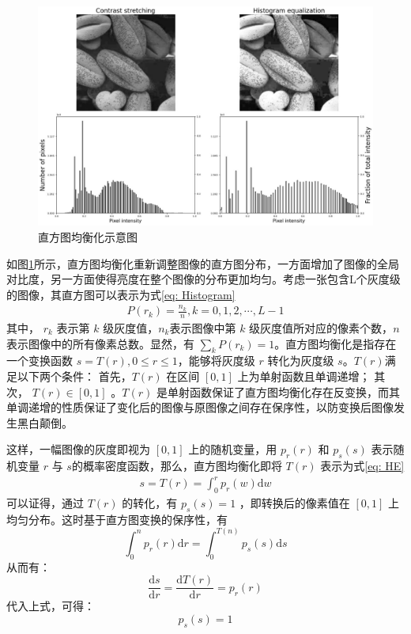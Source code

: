 \documentclass[a4paper, 10pt]{article}
\begin{document}
	\begin{figure}[htb]
		\centering 
		\includegraphics[width=\columnwidth]{picture/LLIE/HE/Histogram equalization}
		\caption{
			\label{fig: Histogram equalization} 
			直方图均衡化示意图
		}
	\end{figure}
	
	如图\ref{fig: Histogram equalization}所示，直方图均衡化重新调整图像的直方图分布，一方面增加了图像的全局对比度，另一方面使得亮度在整个图像的分布更加均匀。考虑一张包含L个灰度级的图像，其直方图可以表示为式\ref{eq: Histogram}
	\begin{equation}
		\begin{aligned}
			P(r_k) = \frac{n_k}{n}, k=0, 1, 2, \cdots, L-1
		\end{aligned}
		\label{eq: Histogram}
	\end{equation}
	其中， $r_k$ 表示第 $k$ 级灰度值，$n_k$表示图像中第 $k$ 级灰度值所对应的像素个数，$n$ 表示图像中的所有像素总数。显然，有 $\sum_{k} P(r_k)=1$。直方图均衡化是指存在一个变换函数 $s=T(r), 0 \leqslant r \leqslant 1$，能够将灰度级 $r$ 转化为灰度级 $s$。$T(r)$满足以下两个条件： 首先，$T(r)$ 在区间 $[0, 1]$ 上为单射函数且单调递增； 其次， $T(r) \in [0, 1]$ 。$T(r)$ 是单射函数保证了直方图均衡化存在反变换，而其单调递增的性质保证了变化后的图像与原图像之间存在保序性，以防变换后图像发生黑白颠倒。
	
	这样，一幅图像的灰度即视为 $[0,1]$ 上的随机变量，用 $p_r(r)$ 和 $p_s(s)$ 表示随机变量 $r$ 与 $s$的概率密度函数，那么，直方图均衡化即将 $T(r)$ 表示为式\ref{eq: HE}
	\begin{equation}
		\begin{aligned}
			s = T(r) = \int_{0}^{r} p_r(w) \mathrm{d}w
		\end{aligned}
		\label{eq: HE}
	\end{equation}
	可以证得，通过 $T(r)$ 的转化，有 $p_s(s) = 1$ ，即转换后的像素值在 $[0, 1]$ 上均匀分布。这时基于直方图变换的保序性，有 $$\int_{0}^{n} p_r(r) \mathrm{d}r = \int_{0}^{T(n)} p_s(s) \mathrm{d}s$$ 从而有： $$\frac{\mathrm{d}s}{\mathrm{d}r} = \frac{\mathrm{d}T(r)}{\mathrm{d}r} = p_r(r)$$ 代入上式，可得： $$p_s(s) = 1$$ 
	
\end{document}
